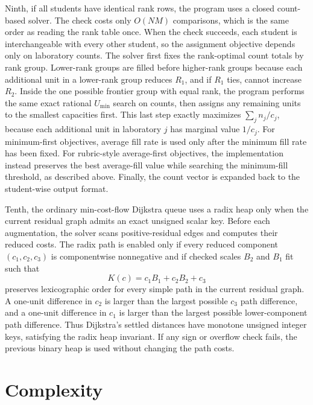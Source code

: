 \documentclass[11pt,a4paper]{article}
\begin{document}
Ninth, if all students have identical rank rows, the program uses a closed
count-based solver.  The check costs only \(O(NM)\) comparisons, which is the
same order as reading the rank table once.  When the check succeeds, each
student is interchangeable with every other student, so the assignment
objective depends only on laboratory counts.  The solver first fixes the
rank-optimal count totals by rank group.  Lower-rank groups are filled before
higher-rank groups because each additional unit in a lower-rank group reduces
\(R_1\), and if \(R_1\) ties, cannot increase \(R_2\).  Inside the one possible
frontier group with equal rank, the program performs the same exact rational
\(U_{\min}\) search on counts, then assigns any remaining units to the
smallest capacities first.  This last step exactly maximizes
\(\sum_j n_j/c_j\), because each additional unit in laboratory \(j\) has
marginal value \(1/c_j\).  For minimum-first objectives, average fill rate is
used only after the minimum fill rate has been fixed.  For rubric-style
average-first objectives, the implementation instead preserves the best
average-fill value while searching the minimum-fill threshold, as described
above.  Finally, the count vector is
expanded back to the student-wise output format.

Tenth, the ordinary min-cost-flow Dijkstra queue uses a radix heap only when
the current residual graph admits an exact unsigned scalar key.  Before each
augmentation, the solver scans positive-residual edges and computes their
reduced costs.  The radix path is enabled only if every reduced component
\((c_1,c_2,c_3)\) is componentwise nonnegative and if checked scales \(B_2\)
and \(B_1\) fit such that
\[
  K(c)=c_1B_1+c_2B_2+c_3
\]
preserves lexicographic order for every simple path in the current residual
graph.  A one-unit difference in \(c_2\) is larger than the largest possible
\(c_3\) path difference, and a one-unit difference in \(c_1\) is larger than
the largest possible lower-component path difference.  Thus Dijkstra's
settled distances have monotone unsigned integer keys, satisfying the radix
heap invariant.  If any sign or overflow check fails, the previous binary heap
is used without changing the path costs.

\section{Complexity}
\end{document}
